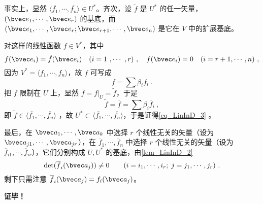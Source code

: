 事实上，显然 $\langle\overline{f_1},\cdots,\overline{f_n}\rangle \in U^*$。齐次，设 $\tilde f$ 是 $U^*$ 的任一矢量，$(\bvec e_1,\cdots,\bvec e_r)$ 的基底，而 $(\bvec e_1,\cdots,\bvec e_r;\bvec e_{r+1},\cdots,\bvec e_n)$ 是它在 $V$ 中的扩展基底。

对这样的线性函数 $f\in V^*$，其中 
\begin{equation}
f(\bvec e_i)=\tilde f(\bvec e_i) \quad(i=1~,\cdots ~,r)~,\quad f(\bvec e_i)=0
\quad (i=r+1,\cdots,n)~,
\end{equation}
因为 $V^*=\langle f_1,\cdots,f_n\rangle$，故 $f$ 可写成
\begin{equation}
f=\sum \beta_if_i~.
\end{equation}
把 $f$ 限制在 $U$ 上，显然 $\overline f=f|_U=\tilde f$，于是
\begin{equation}
\tilde f=\overline f=\sum \beta_i \overline f_i~,
\end{equation}
即 $\tilde f\in\langle\overline{f_1},\cdots,\overline{f_n}\rangle$ ，故 $U^*\subset\langle\overline{f_1},\cdots,\overline{f_n}\rangle$，于是证得\autoref{eq_LinInD_3} 。

最后，在 $\bvec a_1,\cdots,\bvec a_k$ 中选择 $r$ 个线性无关的矢量（设为 $\bvec a_{j1},\cdots,\bvec a_{jr} $），在 $\overline f_1,\cdots ,\overline f_n$ 中选择 $r$ 个线性无关的矢量（设为 $\overline f_{i1},\cdots,\overline f_{ir}$），它们分别构成 $U,U^*$ 的基底，由\autoref{lem_LinInD_2} 
\begin{equation}
\det(\overline f_i(\bvec a_j))\neq0 \qquad (i=i_1,\cdots ,i_r;\; j=j_1,\cdots,j_r)~.
\end{equation}
剩下只需注意 $\overline f_i(\bvec a_j)=f_i(\bvec a_j)$。

\textbf{证毕！}